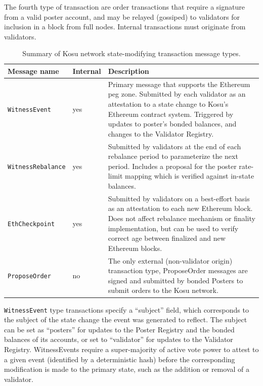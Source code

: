 \documentclass[10pt]{article}
\begin{document}
The fourth type of transaction are order transactions that require a signature from a valid poster account, and may be relayed (gossiped) to validators for inclusion in a block from full nodes. Internal transactions must originate from validators.

\bgroup
\def\arraystretch{1.2}
\begin{table}[H]
\centering
\label{table:table4}
\begin{tabularx}{1\textwidth}{|l|l|X|}
\hline
\textbf{Message name} & \textbf{Internal} & \textbf{Description} \\
\hline
\texttt{WitnessEvent} & yes & Primary message that supports the Ethereum peg zone. Submitted by each validator as an attestation to a state change to Kosu’s Ethereum contract system. Triggered by updates to poster’s bonded balances, and changes to the Validator Registry. \\
\hline
\texttt{WitnessRebalance} & yes & Submitted by validators at the end of each rebalance period to parameterize the next period. Includes a proposal for the poster rate-limit mapping which is verified against in-state balances. \\
\hline
\texttt{EthCheckpoint} & yes & Submitted by validators on a best-effort basis as an attestation to each new Ethereum block. Does not affect rebalance mechanism or finality implementation, but can be used to verify correct age between finalized and new Ethereum blocks. \\
\hline
\texttt{ProposeOrder} & no & The only external (non-validator origin) transaction type, ProposeOrder messages are signed and submitted by bonded Posters to submit orders to the Kosu network. \\
\hline
\end{tabularx}
\caption{Summary of Kosu network state-modifying transaction message types.} 
\end{table}
\egroup

\texttt{WitnessEvent} type transactions specify a “subject” field, which corresponds to the subject of the state change the event was generated to reflect. The subject can be set as “posters” for updates to the Poster Registry and the bonded balances of its accounts, or set to “validator” for updates to the Validator Registry. WitnessEvents require a super-majority of active vote power to attest to a given event (identified by a deterministic hash) before the corresponding modification is made to the primary state, such as the addition or removal of a validator.
\medskip
\end{document}
